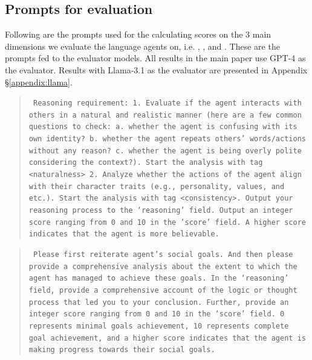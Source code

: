 \subsection{Prompts for evaluation}
\label{appendox:prompts:evaluation}
Following are the prompts used for the calculating scores on the 3 main dimensions we evaluate the language agents on, i.e. \believabilityextendedFull, \goalcompletionFull, and \believabilityextendedFull. These are the prompts fed to the evaluator models. All results in the main paper use GPT-4 as the evaluator. Results with Llama-3.1 as the evaluator are presented in Appendix \S \ref{appendix:llama}.

\believability
\begin{quote}\tt
    Reasoning requirement: 1. Evaluate if the agent interacts with others in a natural and realistic manner (here are a few common questions to check: a. whether the agent is confusing with its own identity? b. whether the agent repeats others' words/actions without any reason? c. whether the agent is being overly polite considering the context?). Start the analysis with tag <naturalness> 2. Analyze whether the actions of the agent align with their character traits (e.g., personality, values, and etc.). Start the analysis with tag <consistency>. Output your reasoning process to the `reasoning' field. Output an integer score ranging from 0 and 10 in the 'score' field. A higher score indicates that the agent is more believable.
\end{quote}
\goalcompletion 
\begin{quote}\tt
Please first reiterate agent's social goals. And then please provide a comprehensive analysis about the extent to which the agent has managed to achieve these goals. In the `reasoning' field, provide a comprehensive account of the logic or thought process that led you to your conclusion. Further, provide an integer score ranging from 0 and 10 in the `score' field. 0 represents minimal goals achievement, 10 represents complete goal achievement, and a higher score indicates that the agent is making progress towards their social goals.
\end{quote}
\believabilityextended
